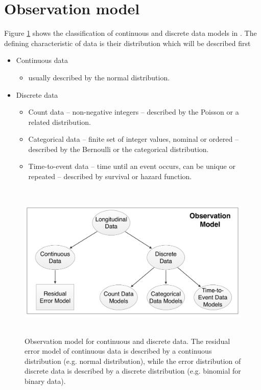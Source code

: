 \section{Observation model}
\label{sec:observationModel}
Figure \ref{fig:observModel} shows the classification of continuous and discrete data models in \pml \currpml. 
The defining characteristic of data is their distribution which will be described first
\begin{itemize}
\item
Continuous data
\begin{itemize}
\item
usually described by the normal distribution.
\end{itemize}
\item
Discrete data
\begin{itemize}
\item
Count data -- non-negative integers -- described by the Poisson or a related distribution.
\item
Categorical data -- finite set of integer values, nominal or ordered -- described by the Bernoulli
or the categorical distribution. 
\item
Time-to-event data -- time until an event occurs, can be unique or repeated -- described by 
survival or hazard function.
\end{itemize}
\end{itemize}

\begin{figure}[h!]
\centering
 \includegraphics[height=75mm]{pics/observationalModel}
\caption{Observation model for continuous and discrete data. 
The residual error model of continuous data is described by a continuous distribution 
(e.g. normal distribution), while the error distribution of discrete data
is described by a discrete distribution (e.g. binomial for binary data).}
\label{fig:observModel}
\end{figure}


